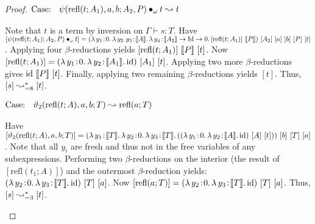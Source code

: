 \begin{proof}
    $\text{Case: }\begin{array}{c} \psi(\text{refl}(t; A_1), a, b; A_2, P) \bullet_{\omega} t \leadsto t \end{array}$
    \begin{proofcase}
        Note that $t$ is a term by inversion on $\Gamma \vdash s : T$.
        Have $[\app{\psi(\text{refl}(t; A_1); A_2, P)}{\omega}{t}] =
            (\abs{\lambda}{y_1}{0}{
                \abs{\lambda}{y_2\ y_3}{\sema{A}}{
                    \abs{\lambda}{y_4}{\sema{A_2} \to \fpId \to 0}{
                        [\text{refl}(t; A_1)]\ \sema{P}
                    }
                }
            })\ [A_2]\ [a]\ [b]\ [P]\ [t]$.
        Applying four $\beta$-reductions yields $[\text{refl}(t; A_1)]\ \sema{P}\ [t]$.
        Now $[\text{refl}(t; A_1)] =
            ({\lambda}\, y_1\! : \! 0.\, 
                {\lambda}\, y_2\! : \! \llbracket A_1 \rrbracket.\, \text{id}
           )\ [A_1]\ [t]$.
        Applying two more $\beta$-reductions gives $\text{id}\ \llbracket P \rrbracket\ [t]$.
        Finally, applying two remaining $\beta$-reductions yields $[t]$.
        Thus, $[s] \leadsto^*_{=8} [t]$.
    \end{proofcase}
    
    $\text{Case: }\begin{array}{c} \vartheta_2(\text{refl}(t; A), a, b; T) \leadsto \text{refl}(a; T) \end{array}$
    \begin{proofcase}
        Have $[\vartheta_2(\text{refl}(t; A), a, b; T)] = (\abs{\lambda}{y_1}{\sema{T}}{
                \abs{\lambda}{y_2}{0} {
                    \abs{\lambda}{y_3}{\sema{T}}{
                        ((\abs{\lambda}{y_1}{0}{
                            \abs{\lambda}{y_2}{\sema{A}}{\fpid}
                        })\ [A]\ [t])
                    }
                }
            })\ [b]\ [T]\ [a]$.
        Note that all $y_i$ are fresh and thus not in the free variables of any subexpressions.
        Performing two $\beta$-reductions on the interior (the result of $[\text{refl}(t_1;A)]$) and the outermost $\beta$-reduction yields:
            $(\abs{\lambda}{y_2}{0} {
                \abs{\lambda}{y_3}{\sema{T}}{
                    \fpid
                }
            })\ [T]\ [a]$.
        Now $[\text{refl}(a; T)] = (\abs{\lambda}{y_2}{0} {
                \abs{\lambda}{y_3}{\sema{T}}{
                    \fpid
                }
            })\ [T]\ [a]$.
        Thus, $[s] \leadsto^*_{=3} [t]$.
    \end{proofcase}
\end{proof}

